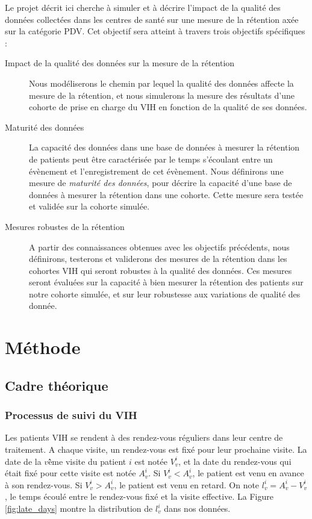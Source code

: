 \documentclass[paper=a4, fontsize=11pt]{scrartcl}
\numberwithin{equation}{section}		%
\numberwithin{figure}{section}			%
\numberwithin{table}{section}				%
\begin{document}
Le projet décrit ici cherche à simuler et à décrire l'impact de la qualité des données collectées dans les centres de santé sur une mesure de la rétention axée sur la catégorie PDV. Cet objectif sera atteint à travers trois objectifs spécifiques :
\begin{description}
	\item[Impact de la qualité des données sur la mesure de la rétention] Nous modéliserons le chemin par lequel la qualité des données affecte la mesure de la rétention, et nous simulerons la mesure des résultats d'une cohorte de prise en charge du VIH en fonction de la qualité de ses données.
	\item[Maturité des données] La capacité des données dans une base de données à mesurer la rétention de patients peut être caractérisée par le temps s'écoulant entre un évènement et l'enregistrement de cet évènement. Nous définirons une mesure de \textit{maturité des données}, pour décrire la capacité d'une base de données à mesurer la rétention dans une cohorte. Cette mesure sera testée et validée sur la cohorte simulée.
	\item[Mesures robustes de la rétention] A partir des connaissances obtenues avec les objectifs précédents, nous définirons, testerons et validerons des mesures de la rétention dans les cohortes VIH qui seront robustes à la qualité des données. Ces mesures seront évaluées sur la capacité à bien mesurer la rétention des patients sur notre cohorte simulée, et sur leur robustesse aux variations de qualité des donnée.
\end{description}

\section{Méthode}
\subsection{Cadre théorique}
\label{sec:theory}

\subsubsection{Processus de suivi du VIH}

Les patients VIH se rendent à des rendez-vous réguliers dans leur centre de traitement. A chaque visite, un rendez-vous est fixé pour leur prochaine visite. La date de la $v$\^{ème} visite du patient $i$ est notée $V_v^i$, et la date du rendez-vous qui était fixé pour cette visite est notée $A_v^i$. Si $V_v^i < A_v^i$, le patient est venu en avance à son rendez-vous. Si $V_v^i > A_v^i$, le patient est venu en retard. On note $l_v^i = A_v^i - V_v^i$, le temps écoulé entre le rendez-vous fixé et la visite effective. La Figure \ref{fig:late_days} montre la distribution de $l_v^i$ dans nos données.
\end{document}
